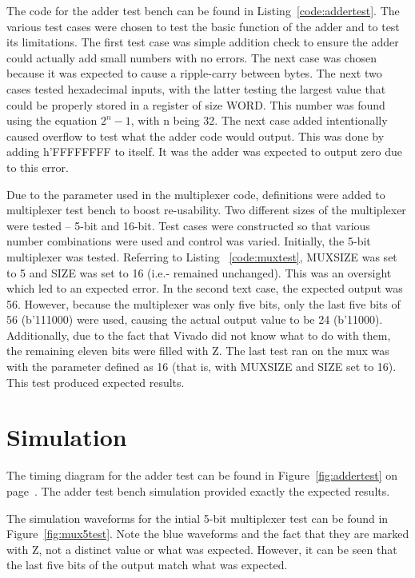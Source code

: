 \documentclass{article}
\newcommand{\Verilog}[3]{
  \lstset{language=Verilog}
  \lstset{backgroundcolor=\color{listinggray},rulecolor=\color{blue}}
  \lstset{linewidth=\textwidth}
  \lstset{commentstyle=\textit, stringstyle=\upshape,showspaces=false}
  \lstset{frame=tb}
  
}
\begin{document}
The code for the adder test bench can be found in Listing~\ref{code:addertest}. The various test cases were chosen to test the basic function of the adder and to test its limitations. The first test case was simple addition check to ensure the adder could actually add small numbers with no errors. The next case was chosen because it was expected to cause a ripple-carry between bytes. The next two cases tested hexadecimal inputs, with the latter testing the largest value that could be properly stored in a register of size WORD. This number was found using the equation $2^n -1$, with n being 32. The next case added intentionally caused overflow to test what the adder code would output. This was done by adding h'FFFFFFFF to itself. It was the adder was expected to output zero due to this error. 

\Verilog{Verilog code for testing an adder.}{code:addertest}{H:/MIPS-Lab/code/0_common/adder_test.v}

Due to the parameter used in the multiplexer code, definitions were added to multiplexer test bench to boost re-usability. Two different sizes of the multiplexer were tested -- 5-bit and 16-bit. Test cases were constructed so that various number combinations were used and control was varied. Initially, the 5-bit  multiplexer was tested. Referring to Listing ~\ref{code:muxtest}, MUXSIZE was set to 5 and SIZE was set to 16 (i.e.- remained unchanged). This was an oversight which led to an expected error. In the second text case, the expected output was 56. However, because the multiplexer was only five bits, only the last five bits of 56 (b'111000) were used, causing the actual output value to be 24 (b'11000). Additionally, due to the fact that Vivado did not know what to do with them, the remaining eleven bits were filled with Z.
The last test ran on the mux was with the parameter defined as 16 (that is, with MUXSIZE and SIZE set to 16). This test produced expected results.


\Verilog{Verilog code for testing a mux.}{code:muxtest}{H:/MIPS-Lab/code/0_common/mux_test.v}

\section{Simulation}
The timing diagram for the adder test can be found in Figure~\ref{fig:addertest} on page~\pageref{fig:regtest}. The adder test bench simulation provided exactly the expected results.

The simulation waveforms for the intial 5-bit multiplexer test can be found in Figure~\ref{fig:mux5test}. Note the blue waveforms and the fact that they are marked with Z, not a distinct value or what was expected. However, it can be seen that the last five bits of the output match what was expected.
\end{document}
